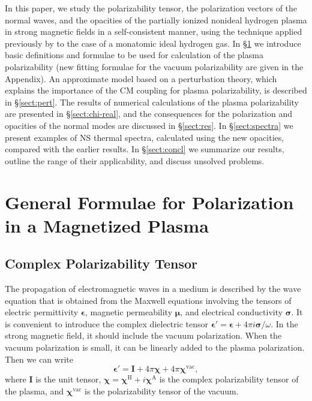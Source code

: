 \documentclass{emulateapj}
\newcommand{\beq}{\begin{equation}}
\newcommand{\eeq}{\end{equation}}
\newcommand{\ChiH}{\bm{\chi}^\mathrm{H}}
\newcommand{\ChiA}{\bm{\chi}^\mathrm{A}}
\begin{document}
In this paper, we study the polarizability tensor, the polarization
vectors of the normal waves, and the opacities of the partially ionized
nonideal hydrogen plasma in strong magnetic fields in a self-consistent
manner, using the technique applied previously by \citet{BulikPavlov}
to the case of a monatomic ideal hydrogen gas. In \S\ref{sect:general}
we introduce basic definitions and formulae to be used for calculation
of the plasma polarizability (new fitting formulae for the vacuum
polarizability are given in the Appendix). An approximate model based
on a perturbation theory, which explains the importance of the CM
coupling for plasma polarizability, is described in \S\ref{sect:pert}.
The results of numerical calculations of the plasma polarizability are
presented in \S\ref{sect:chi-real}, and the consequences for the
polarization and opacities of the normal modes are discussed in
\S\ref{sect:res}. In \S\ref{sect:spectra} we present examples of NS
thermal spectra, calculated using the new opacities, compared with the
earlier results. In \S\ref{sect:concl} 
we summarize our results, outline the range of their
applicability, and discuss unsolved problems.

\section{General Formulae for Polarization in a Magnetized Plasma}
\label{sect:general}

\subsection{Complex Polarizability Tensor}

The propagation of electromagnetic waves in a medium is
described by the wave equation that is obtained 
from the Maxwell equations involving the tensors 
of electric permittivity $\bm{\epsilon}$,
magnetic permeability $\bm{\mu}$, 
and electrical conductivity $\bm{\sigma}$.
It is convenient \citep[e.g.,][]{Ginzburg} to introduce 
the complex dielectric tensor 
$\bm{\epsilon}'=\bm{\epsilon}+4\pi i \bm{\sigma}/\omega$.
In the strong magnetic field, 
it should include the vacuum polarization. 
When the vacuum polarization is small, it can be linearly added
to the plasma polarization. Then we can write
\beq
 \bm{\epsilon}' = \mathbf{I} + 4\pi\bm{\chi} + 4\pi\bm{\chi}^\mathrm{vac},
\label{linear}
\eeq
where $\mathbf{I}$ is the unit tensor, 
$\bm{\chi}=\ChiH+i\ChiA$ is the complex polarizability tensor of the plasma,
and $\bm{\chi}^\mathrm{vac}$ is the polarizability tensor of the vacuum.
\end{document}
